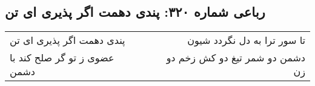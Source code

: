 \begin{center}
\section*{رباعی شماره ۳۲۰: پندی دهمت اگر پذیری ای تن}
\label{sec:sh320}
\begin{longtable}{l p{0.5cm} r}
پندی دهمت اگر پذیری ای تن
&&
تا سور ترا به دل نگردد شیون
\\
عضوی ز تو گر صلح کند با دشمن
&&
دشمن دو شمر تیغ دو کش زخم دو زن
\\
\end{longtable}
\end{center}
